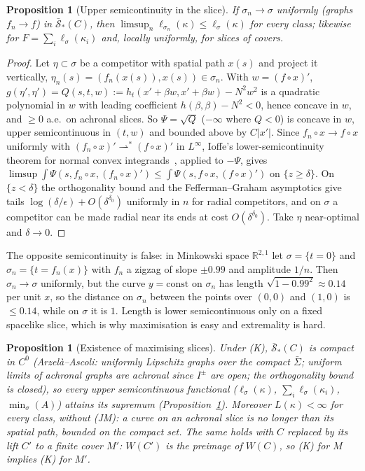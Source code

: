 \documentclass[aps,prd,onecolumn,superscriptaddress,nofootinbib,amsmath,amssymb,11pt]{revtex4-2}
\newtheorem{proposition}[theorem]{Proposition}
\theoremstyle{definition}
\newcommand{\R}{\mathbb{R}}
\newcommand{\eps}{\epsilon}
\begin{document}
\begin{proposition}[Upper semicontinuity in the slice]\label{prop:U}
If $\sigma_n\to\sigma$ uniformly (graphs $f_n\to f$) in $\bar{\mathcal S}_*(C)$, then $\limsup_n\ell_{\sigma_n}(\kappa)\le\ell_\sigma(\kappa)$ for every
class; likewise for $F=\sum_i\ell_\sigma(\kappa_i)$ and, locally uniformly, for slices of covers.
\end{proposition}

\begin{proof}
Let $\eta\subset\sigma$ be a competitor with spatial path $x(s)$ and project it vertically, $\eta_n(s)=(f_n(x(s)),x(s))\in\sigma_n$. With
$w=(f\circ x)'$, $g(\eta',\eta')=Q(s,t,w):=h_t(x'+\beta w,x'+\beta w)-N^2w^2$ is a quadratic polynomial in $w$ with leading coefficient
$h(\beta,\beta)-N^2<0$, hence concave in $w$, and $\ge0$ a.e.\ on achronal slices. So $\Psi=\sqrt Q$ ($-\infty$ where $Q<0$) is concave in $w$,
upper semicontinuous in $(t,w)$ and bounded above by $C|x'|$. Since $f_n\circ x\to f\circ x$ uniformly with $(f_n\circ x)'\rightharpoonup^*(f\circ x)'$
in $L^\infty$, Ioffe's lower-semicontinuity theorem for normal convex integrands~\cite{Ioffe1977}, applied to $-\Psi$, gives
$\limsup\int\Psi(s,f_n\circ x,(f_n\circ x)')\le\int\Psi(s,f\circ x,(f\circ x)')$ on $\{z\ge\delta\}$. On $\{z<\delta\}$ the orthogonality bound
and the Fefferman--Graham asymptotics give tails $\log(\delta/\eps)+O(\delta^{\delta_0})$ uniformly in $n$ for radial competitors, and on
$\sigma$ a competitor can be made radial near its ends at cost $O(\delta^{\delta_0})$. Take $\eta$ near-optimal and $\delta\to0$.
\end{proof}

The opposite semicontinuity is false: in Minkowski space $\R^{2,1}$ let $\sigma=\{t=0\}$ and $\sigma_n=\{t=f_n(x)\}$ with $f_n$ a zigzag of
slope $\pm0.99$ and amplitude $1/n$. Then $\sigma_n\to\sigma$ uniformly, but the curve $y=\text{const}$ on $\sigma_n$ has length
$\sqrt{1-0.99^2}\approx0.14$ per unit $x$, so the distance on $\sigma_n$ between the points over $(0,0)$ and $(1,0)$ is $\le0.14$, while on
$\sigma$ it is $1$. Length is lower semicontinuous only on a fixed spacelike slice, which is why maximisation is easy and extremality
is hard.

\begin{proposition}[Existence of maximising slices]\label{prop:E}
Under (K), $\bar{\mathcal S}_*(C)$ is compact in $C^0$ (Arzel\`a--Ascoli: uniformly Lipschitz graphs over the compact $\bar\Sigma$; uniform
limits of achronal graphs are achronal since $I^\pm$ are open; the orthogonality bound is closed), so every upper semicontinuous
functional ($\ell_\sigma(\kappa)$, $\sum_i\ell_\sigma(\kappa_i)$, $\min_\sigma(A)$) attains its supremum (Proposition~\ref{prop:U}). Moreover $L(\kappa)<\infty$
for every class, without (JM): a curve on an achronal slice is no longer than its spatial path, bounded on the compact set.
The same holds with $C$ replaced by its lift $C'$ to a finite cover $M'$: $W(C')$ is the preimage of $W(C)$, so (K) for $M$ implies (K)
for $M'$.
\end{proposition}
\end{document}
